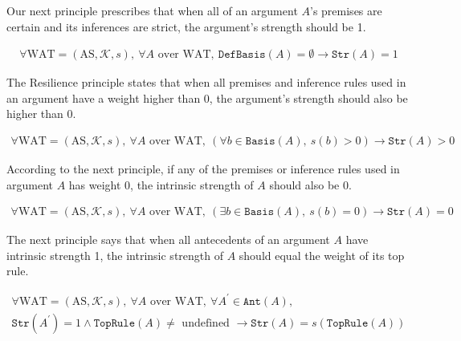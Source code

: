\documentclass[runningheads]{llncs}
\newcommand{\K}{\mathcal{K}}
\newcommand{\pr}{^\prime}
\newcommand{\TopRule}{\texttt{TopRule}}
\newcommand{\Ant}{\texttt{Ant}}
\newcommand{\Str}{\texttt{Str}}
\newcommand{\B}{\texttt{Basis}}
\newcommand{\DefB}{\texttt{DefBasis}}
\begin{document}
Our next principle prescribes that when all of an argument $A$'s premises are certain and its inferences are strict, the argument's strength should be 1.
\begin{principle}\leavevmode
\begin{gather*}
    \forall \text{WAT} = ( \text{AS}, \K, s ),\ \forall A \text{ over WAT},\ \DefB(A) = \emptyset \rightarrow \Str(A) = 1
\end{gather*}
\end{principle}

The Resilience principle states that when all premises and inference rules used in an argument have a weight higher than 0, the argument's strength should also be higher than 0.
\begin{principle}[Resilience]
\begin{gather*}
    \forall \text{WAT} = ( \text{AS}, \K, s ),\ \forall A \text{ over WAT},\ (\forall b \in \B(A),\ s(b) > 0) \rightarrow \Str(A) > 0
\end{gather*}
\end{principle}

According to the next principle, if any of the premises or inference rules used in argument $A$ has weight 0, the intrinsic strength of $A$ should also be 0.
\begin{principle}
\begin{gather*}
    \forall \text{WAT} = ( \text{AS}, \K, s ),\ \forall A \text{ over WAT},\ (\exists b \in \B(A),\ s(b) = 0) \rightarrow \Str(A) = 0
\end{gather*}
\end{principle}


The next principle says that when all antecedents of an argument $A$ have intrinsic strength 1, the intrinsic strength of $A$ should equal the weight of its top rule.
\begin{principle}
\begin{multline*}
    \forall \text{WAT} = ( \text{AS}, \K, s ),\ \forall A \text{ over WAT},\ \forall A\pr \in \Ant(A),\\\Str(A\pr) = 1 \wedge \TopRule(A) \neq \text{ undefined } \rightarrow \Str(A) = s(\TopRule(A))
\end{multline*}
\end{principle}
\end{document}
